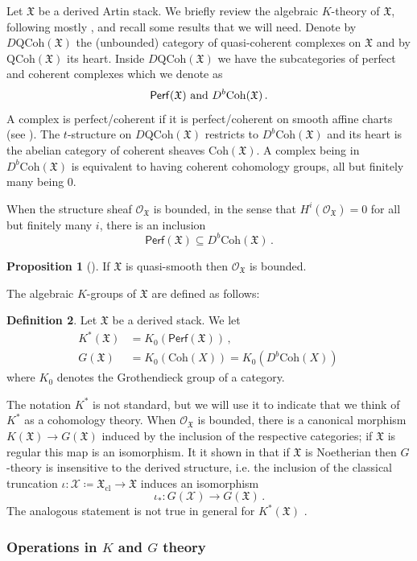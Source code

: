 \documentclass[12pt]{amsart}
\theoremstyle{definition}
\newtheorem{definition}{Definition}[section]
\newtheorem{proposition}[definition]{Proposition}
\newcommand{\CO}{{\mathcal O}}
\newcommand{\CX}{{\mathcal X}}
\newcommand{\1}{\mathbf 1}
\newcommand{\FX}{{\mathfrak{X}}}
\newcommand{\Coh}{\mathrm{Coh}}
\newcommand{\QCoh}{\mathrm{QCoh}}
\newcommand{\Perf}{\mathsf{Perf}}
\newcommand{\cl}{\mathrm{cl}}
\begin{document}
Let $\FX$ be a derived Artin stack. We briefly review the algebraic $K$-theory of $\FX$, following mostly \cite{khan}, and recall some results that we will need. Denote by $D\QCoh(\FX)$ the (unbounded) category of quasi-coherent complexes on $\FX$ and by $\QCoh(\FX)$ its heart. Inside $D\QCoh(\FX)$ we have the subcategories of perfect and coherent complexes which we denote as
\[\Perf(\FX)\textup{ and }D^b\Coh(\FX)\,.\]
A complex is perfect/coherent if it is perfect/coherent on smooth affine charts (see \cite[Definition 1.5]{khan}). The $t$-structure on $D\QCoh(\FX)$ restricts to $D^b\Coh(\FX)$ and its heart is the abelian category of coherent sheaves $\Coh(\FX)$. A complex being in $D^b\Coh(\FX)$ is equivalent to having coherent cohomology groups, all but finitely many being 0.

When the structure sheaf $\CO_\FX$ is bounded, in the sense that $H^i(\CO_{\FX})=0$ for all but finitely many $i$, there is an inclusion 
\[\Perf(\FX)\subseteq D^b\Coh(\FX)\,.\]
\begin{proposition}[{\cite[Corollary 6.1]{khan}}]\label{prop: quasismoothObounded}
    If $\FX$ is quasi-smooth then $\CO_\FX$ is bounded.
\end{proposition}
The algebraic $K$-groups of $\FX$ are defined as follows:
\begin{definition}\label{def: KG}
    Let $\FX$ be a derived stack. We let
    \begin{align*}
        K^\ast(\FX)&=K_0(\Perf(\FX))\,,\\
        G(\FX)&=K_0(\Coh(X))=K_0(D^b\Coh(X))\,
     \end{align*}
     where $K_0$ denotes the Grothendieck group of a category.
\end{definition}

The notation $K^\ast$ is not standard, but we will use it to indicate that we think of $K^\ast$ as a cohomology theory. When $\CO_\FX$ is bounded, there is a canonical morphism $K(\FX)\to G(\FX)$ induced by the inclusion of the respective categories; if $\FX$ is regular this map is an isomorphism. It it shown in \cite[Corollary 3.4]{khan} that if $\FX$ is Noetherian then $G$-theory is insensitive to the derived structure, i.e. the inclusion of the classical truncation $\iota\colon \CX\coloneqq \FX_{\cl}\to \FX$ induces an isomorphism
\[\iota_\ast\colon G(\CX)\to G(\FX)\,.\]
The analogous statement is not true in general for $K^\ast(\FX)$ \cite{annala}.


\subsubsection{Operations in $K$ and $G$ theory}
\label{subsec: operationsKG}
\end{document}
